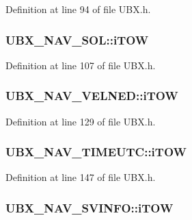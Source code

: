 Definition at line 94 of file U\-B\-X.\-h.

\hypertarget{group___g_s_p_module_ga22a48bcb2972bbd63bf5b5c0a29b8713}{
\subsubsection[{i\-T\-O\-W}]{ U\-B\-X\-\_\-\-N\-A\-V\-\_\-\-S\-O\-L\-::i\-T\-O\-W}}\label{group___g_s_p_module_ga22a48bcb2972bbd63bf5b5c0a29b8713}


Definition at line 107 of file U\-B\-X.\-h.

\hypertarget{group___g_s_p_module_gaf2aa06ea75e992d2933728a9eb390734}{
\subsubsection[{i\-T\-O\-W}]{ U\-B\-X\-\_\-\-N\-A\-V\-\_\-\-V\-E\-L\-N\-E\-D\-::i\-T\-O\-W}}\label{group___g_s_p_module_gaf2aa06ea75e992d2933728a9eb390734}


Definition at line 129 of file U\-B\-X.\-h.

\hypertarget{group___g_s_p_module_gad71c5daaee202e2453fd942712b931d8}{
\subsubsection[{i\-T\-O\-W}]{ U\-B\-X\-\_\-\-N\-A\-V\-\_\-\-T\-I\-M\-E\-U\-T\-C\-::i\-T\-O\-W}}\label{group___g_s_p_module_gad71c5daaee202e2453fd942712b931d8}


Definition at line 147 of file U\-B\-X.\-h.

\hypertarget{group___g_s_p_module_gaf3c4fbdc3e4b6fe40fae556f1de555bb}{
\subsubsection[{i\-T\-O\-W}]{ U\-B\-X\-\_\-\-N\-A\-V\-\_\-\-S\-V\-I\-N\-F\-O\-::i\-T\-O\-W}}\label{group___g_s_p_module_gaf3c4fbdc3e4b6fe40fae556f1de555bb}


